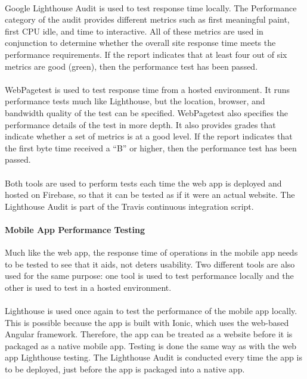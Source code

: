 \documentclass[a4paper, 11pt]{article}
\begin{document}
            \paragraph{}
            Google Lighthouse Audit is used to test response time locally. The Performance category of the audit provides different metrics such as first meaningful paint, first CPU idle, and time to interactive. All of these metrics are used in conjunction to determine whether the overall site response time meets the performance requirements. If the report indicates that at least four out of six metrics are good (green), then the performance test has been passed.
            \paragraph{}
            WebPagetest is used to test response time from a hosted environment. It runs performance tests much like Lighthouse, but the location, browser, and bandwidth quality of the test can be specified. WebPagetest also specifies the performance details of the test in more depth. It also provides grades that indicate whether a set of metrics is at a good level. If the report indicates that the first byte time received a “B” or higher, then the performance test has been passed.
            \paragraph{}
            Both tools are used to perform tests each time the web app is deployed and hosted on Firebase, so that it can be tested as if it were an actual website. The Lighthouse Audit is part of the Travis continuous integration script.
            \paragraph{Mobile App Performance Testing}
            Much like the web app, the response time of operations in the mobile app needs to be tested to see that it aids, not deters usability. Two different tools are also used for the same purpose: one tool is used to test performance locally and the other is used to test in a hosted environment.
            \paragraph{}
            Lighthouse is used once again to test the performance of the mobile app locally. This is possible because the app is built with Ionic, which uses the web-based Angular framework. Therefore, the app can be treated as a website before it is packaged as a native mobile app. Testing is done the same way as with the web app Lighthouse testing. The Lighthouse Audit is conducted every time the app is to be deployed, just before the app is packaged into a native app.
\end{document}
